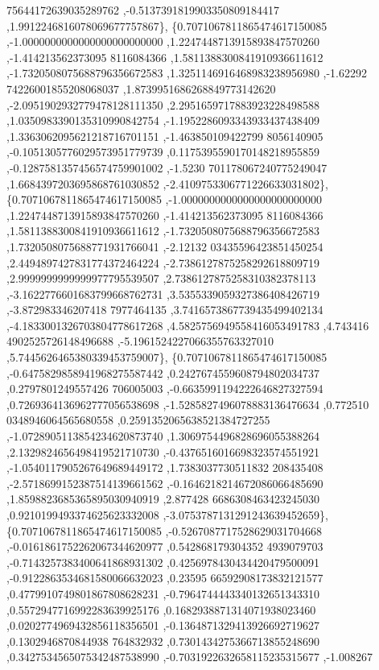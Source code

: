 \begin{DoxyCode}
      75644172639035289762 ,-0.5137391819903350809184417 ,1.9912246816078069677757867\},
\{0.7071067811865474617150085 ,-1.0000000000000000000000000 ,1.2247448713915893847570260 ,-1.414213562373095
      8116084366 ,1.5811388300841910936611612 ,-1.7320508075688796356672583 ,1.3251146916468983238956980 ,-1.62292
      74226001855208068037 ,1.8739951686268849773142620 ,-2.0951902932779478128111350 ,2.2951659717883923228498588
       ,1.0350983390135310990842754 ,-1.1952286093343933437438409 ,1.3363062095621218716701151 ,-1.463850109422799
      8056140905 ,-0.1051305776029573951779739 ,0.1175395590170148218955859 ,-0.1287581357456574759901002 ,-1.5230
      701178067240775249047 ,1.6684397203695868761030852 ,-2.4109753306771226633031802\},
\{0.7071067811865474617150085 ,-1.0000000000000000000000000 ,1.2247448713915893847570260 ,-1.414213562373095
      8116084366 ,1.5811388300841910936611612 ,-1.7320508075688796356672583 ,1.7320508075688771931766041 ,-2.12132
      03435596423851450254 ,2.4494897427831774372464224 ,-2.7386127875258292618809719 ,2.9999999999999977795539507
       ,2.7386127875258310382378113 ,-3.1622776601683799668762731 ,3.5355339059327386408426719 ,-3.872983346207418
      7977464135 ,3.7416573867739435499402134 ,-4.1833001326703804778617268 ,4.5825756949558416053491783 ,4.743416
      4902525726148496688 ,-5.1961524227066355763327010 ,5.7445626465380339453759007\},
\{0.7071067811865474617150085 ,-0.6475829858941968275587442 ,0.2427674559608794802034737 ,0.2797801249557426
      706005003 ,-0.6635991194222646827327594 ,0.7269364136962777056538698 ,-1.5285827496078883136476634 ,0.772510
      0348946064565680558 ,0.2591352065638521384727255 ,-1.0728905113854234620873740 ,1.3069754496828696055388264 
      ,2.1329824656498419521710730 ,-0.4376516016698323574551921 ,-1.0540117905267649689449172 ,1.7383037730511832
      208435408 ,-2.5718699152387514139661562 ,-0.1646218214672086066485690 ,1.8598823685365895030940919 ,2.877428
      6686308463423245030 ,0.9210199493374625623332008 ,-3.0753787131291243639452659\},
\{0.7071067811865474617150085 ,-0.5267087717528629031704668 ,-0.0161861752262067344620977 ,0.542868179304352
      4939079703 ,-0.7143257383400641868931302 ,0.4256978430434420479500091 ,-0.9122863534681580066632023 ,0.23595
      66592908173832121577 ,0.4779910749801867808628231 ,-0.7964744443340132651343310 ,0.5572947716992283639925176
       ,0.1682938871314071938023460 ,0.0202774969432856118356501 ,-0.1364871329413926692719627 ,0.1302946870844938
      764832932 ,0.7301434275366713855248690 ,0.3427534565075342487538990 ,-0.7031922632658115235315677 ,-1.008267

\end{DoxyCode}
